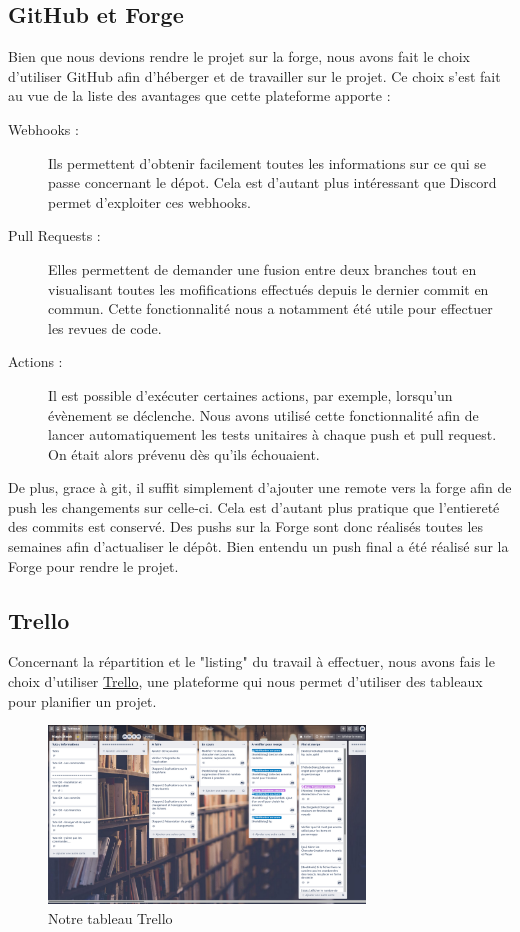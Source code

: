 		\subsection{GitHub et Forge}

			Bien que nous devions rendre le projet sur la forge, nous avons fait le choix d'utiliser GitHub afin d'héberger et de travailler sur le projet. Ce choix s'est fait au vue de la liste des avantages que cette plateforme apporte :

			\begin{description}
				\item[Webhooks :]{Ils permettent d'obtenir facilement toutes les informations sur ce qui se passe concernant le dépot. Cela est d'autant plus intéressant que Discord permet d'exploiter ces webhooks.}
				\item[Pull Requests :]{Elles permettent de demander une fusion entre deux branches tout en visualisant toutes les mofifications effectués depuis le dernier commit en commun. Cette fonctionnalité nous a notamment été utile pour effectuer les revues de code.}
				\item[Actions :]{Il est possible d'exécuter certaines actions, par exemple, lorsqu'un évènement se déclenche. Nous avons utilisé cette fonctionnalité afin de lancer automatiquement les tests unitaires à chaque push et pull request. On était alors prévenu dès qu'ils échouaient.}
			\end{description}

			De plus, grace à git, il suffit simplement d'ajouter une remote vers la forge afin de push les changements sur celle-ci. Cela est d'autant plus pratique que l'entiereté des commits est conservé. Des pushs sur la Forge sont donc réalisés toutes les semaines afin d'actualiser le dépôt. Bien entendu un push final a été réalisé sur la Forge pour rendre le projet.

		\subsection{Trello}

			Concernant la répartition et le "listing" du travail à effectuer, nous avons fais le choix d'utiliser \href{https://trello.com}{Trello}, une plateforme qui nous permet d'utiliser des tableaux pour planifier un projet.

			\begin{figure}[H]
				\centering\includegraphics[width=0.75\textwidth, keepaspectratio]{img/trello.png}
				\caption{Notre tableau Trello}
				\label{fig:trello}
			\end{figure}

